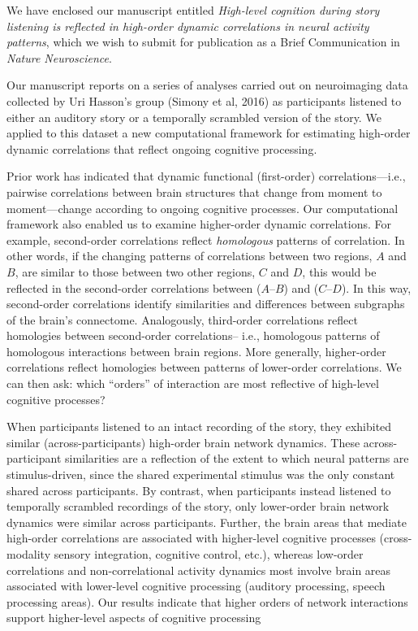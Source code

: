 \documentclass[11pt,stdletter,orderfromtodate,sigleft]{newlfm}
\begin{document}
\begin{newlfm}
  We have enclosed our manuscript entitled \textit{High-level
    cognition during story listening is reflected in high-order
    dynamic correlations in neural activity patterns}, which we wish
  to submit for publication as a Brief Communication in \textit{Nature
    Neuroscience}.

  Our manuscript reports on a series of analyses carried out on
  neuroimaging data collected by Uri Hasson's group (Simony et al,
  2016) as participants listened to either an auditory story or a
  temporally scrambled version of the story.  We applied to this
  dataset a new computational framework for estimating high-order
  dynamic correlations that reflect ongoing cognitive processing.

  Prior work has indicated that dynamic functional (first-order)
  correlations---i.e., pairwise correlations between brain structures
  that change from moment to moment---change according to ongoing
  cognitive processes.  Our computational framework also enabled us to
  examine higher-order dynamic correlations.  For example,
  second-order correlations reflect \textit{homologous} patterns of
  correlation.  In other words, if the changing patterns of
  correlations between two regions, $A$ and $B$, are similar to those
  between two other regions, $C$ and $D$, this would be reflected in
  the second-order correlations between ($A$--$B$) and ($C$--$D$).  In
  this way, second-order correlations identify similarities and
  differences between subgraphs of the brain's connectome.
  Analogously, third-order correlations reflect homologies between
  second-order correlations-- i.e., homologous patterns of homologous
  interactions between brain regions.  More generally, higher-order
  correlations reflect homologies between patterns of lower-order
  correlations.  We can then ask: which ``orders'' of interaction are
  most reflective of high-level cognitive processes?

  When participants listened to an intact recording of the story, they
  exhibited similar (across-participants) high-order brain network
  dynamics.  These across-participant similarities are a reflection of
  the extent to which neural patterns are stimulus-driven, since the
  shared experimental stimulus was the only constant shared across
  participants.  By contrast, when participants instead listened to
  temporally scrambled recordings of the story, only lower-order brain
  network dynamics were similar across participants.  Further, the
  brain areas that mediate high-order correlations are associated with
  higher-level cognitive processes (cross-modality sensory
  integration, cognitive control, etc.), whereas low-order
  correlations and non-correlational activity dynamics most involve
  brain areas associated with lower-level cognitive processing
  (auditory processing, speech processing areas).  Our results
  indicate that higher orders of network interactions support
  higher-level aspects of cognitive processing


\end{newlfm}
\end{document}
